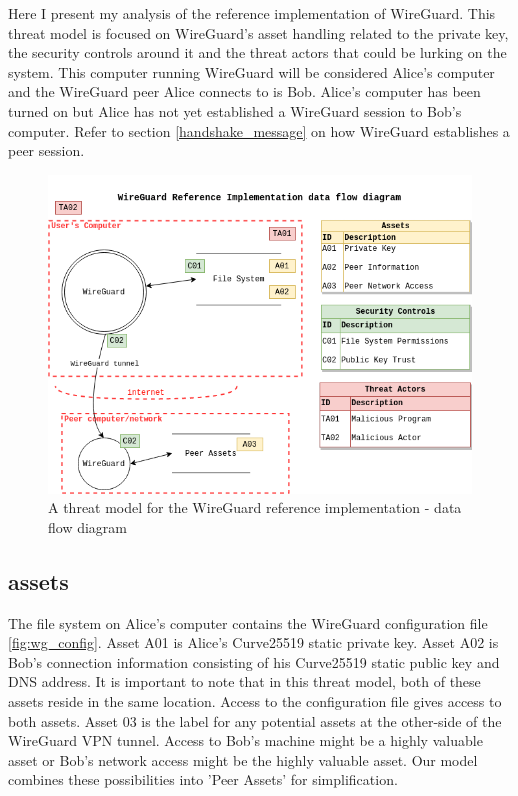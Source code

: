 \documentclass [11pt, proquest] {uwthesis}[2020/02/24]
\begin{document}
Here I present my analysis of the reference implementation of WireGuard. This threat model is focused on WireGuard's asset handling related to the private key, the security controls around it and the threat actors that could be lurking on the system. This computer running WireGuard will be considered Alice's computer and the WireGuard peer Alice connects to is Bob. Alice's computer has been turned on but Alice has not yet established a WireGuard session to Bob's computer. Refer to section \ref{handshake_message} on how WireGuard establishes a peer session. 

\begin{figure}[ht]
\includegraphics[width=14cm]{paper/images/WG_DFD.drawio.png}
\caption{A threat model for the WireGuard reference implementation - data flow diagram}
\label{fig:wg_ref_dfd}
\end{figure}

\subsection{assets}
The file system on Alice's computer contains the WireGuard configuration file \ref{fig:wg_config}. 
Asset A01 is Alice's Curve25519 static private key. Asset A02 is Bob's connection information consisting of his Curve25519 static public key and DNS address. It is important to note that in this threat model, both of these assets reside in the same location. Access to the configuration file gives access to both assets.
Asset 03 is the label for any potential assets at the other-side of the WireGuard VPN tunnel. Access to Bob's machine might be a highly valuable asset or Bob's network access might be the highly valuable asset. Our model combines these possibilities into 'Peer Assets' for simplification.
\end{document}
